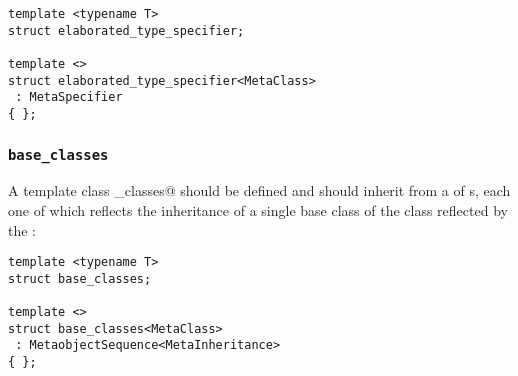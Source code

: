 \begin{verbatim}
template <typename T>
struct elaborated_type_specifier;

template <>
struct elaborated_type_specifier<MetaClass>
 : MetaSpecifier
{ };
\end{verbatim}

\subsubsection{\texttt{base\_classes}}

A template class \verb@base_classes@ should be defined and should inherit from
a  of s, each one of which reflects the inheritance
of a single base class of the class reflected by the :

\begin{verbatim}
template <typename T>
struct base_classes;

template <>
struct base_classes<MetaClass>
 : MetaobjectSequence<MetaInheritance>
{ };
\end{verbatim}

